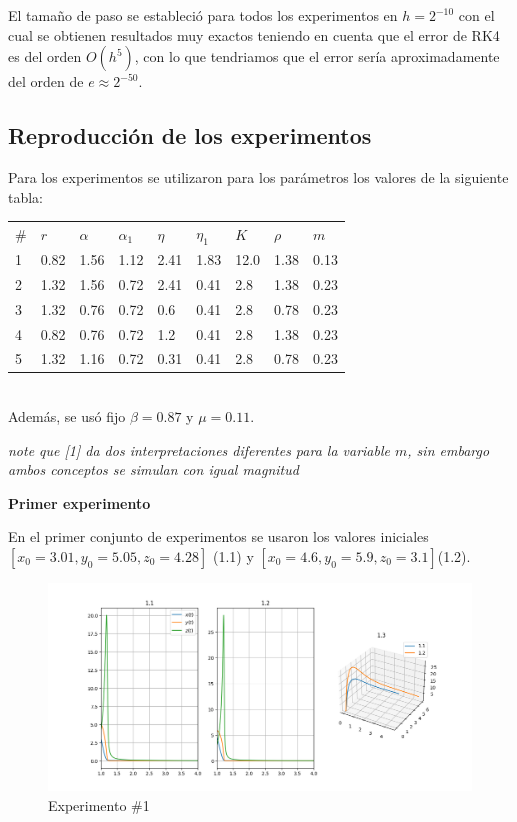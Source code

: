 \documentclass{wscpaperproc}
\theoremstyle{wsc}
\begin{document}
El tamaño de paso se estableció para todos los experimentos en
$h=2^{-10}$ con el cual se obtienen resultados muy exactos teniendo
en cuenta que el error de RK4 es del orden $O(h^5)$, con lo que tendriamos
que el error sería aproximadamente del orden de $e \approx 2^{-50}$.

\subsection*{Reproducción de los experimentos}

Para los experimentos se utilizaron para los parámetros los valores de la siguiente tabla:

\begin{tabular}{p{1cm} | p{1cm} | p{1cm} | p{1cm} | p{1cm} | p{1cm} | p{1cm} | p{1cm} | p{1cm} }
	$\#$ & $r$  & $\alpha$ & $\alpha_1$ & $\eta$ & $\eta_1$ & $K$  & $\rho$ & $m$  \\
	1    & 0.82 & 1.56     & 1.12       & 2.41   & 1.83     & 12.0 & 1.38   & 0.13 \\
	2    & 1.32 & 1.56     & 0.72       & 2.41   & 0.41     & 2.8  & 1.38   & 0.23 \\
	3    & 1.32 & 0.76     & 0.72       & 0.6    & 0.41     & 2.8  & 0.78   & 0.23 \\
	4    & 0.82 & 0.76     & 0.72       & 1.2    & 0.41     & 2.8  & 1.38   & 0.23 \\
	5    & 1.32 & 1.16     & 0.72       & 0.31   & 0.41     & 2.8  & 0.78   & 0.23 \\
\end{tabular}
\\

Además, se usó fijo $\beta=0.87$ y $\mu=0.11$.

	{\it note que [1] da dos interpretaciones diferentes para la variable $m$, sin embargo ambos conceptos se simulan con igual magnitud}

\vspace*{0.5cm}
{\bf Primer experimento}

En el primer conjunto de experimentos se usaron los valores iniciales $[x_0=3.01, y_0=5.05, z_0=4.28]$ (1.1)
y $[x_0=4.6, y_0=5.9, z_0=3.1]$(1.2).

\begin{figure}[h!]
	\includegraphics[width=\linewidth]{../numerical_models/images/1.png}
	\caption{Experimento \#1}
\end{figure}
\end{document}

